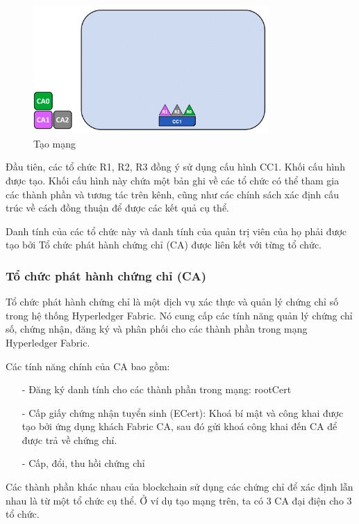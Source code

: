 \begin{figure}[h]
    \centering
    \includegraphics[width=0.8\textwidth]{images/create_network.png}
    \caption{Tạo mạng }
\end{figure}
Đầu tiên, các tổ chức R1, R2, R3 đồng ý sử dụng cấu hình CC1. Khối cấu hình được tạo. 
Khối cấu hình này chứa một bản ghi về các tổ chức có thể tham gia các thành phần và 
tương tác trên kênh, cũng như các chính sách xác định cấu trúc về cách đồng thuận để được các kết quả cụ thể.

Danh tính của các tổ chức này và danh tính của quản trị viên của họ phải 
được tạo bởi Tổ chức phát hành chứng chỉ (CA) được liên kết với từng tổ chức.

\subsubsection*{Tổ chức phát hành chứng chỉ (CA)}

Tổ chức phát hành chứng chỉ là một dịch vụ xác thực và quản lý chứng chỉ số trong hệ thống Hyperledger 
Fabric. Nó cung cấp các tính năng quản lý chứng chỉ số, chứng nhận, đăng ký và phân phối cho các thành 
phần trong mạng Hyperledger Fabric.

Các tính năng chính của CA bao gồm:

\begin{itemize}
    \item[-] Đăng ký danh tính cho các thành phần trong mạng: rootCert
    \item[-] Cấp giấy chứng nhận tuyển sinh (ECert): Khoá bí mật và công khai được tạo bởi ứng dụng khách Fabric CA, sau đó gửi khoá công khai
    đến CA để được trả về chứng chỉ.
    \item[-] Cấp, đổi, thu hồi chứng chỉ
\end{itemize}



Các thành phần khác nhau của blockchain sử dụng các chứng 
chỉ để xác định lẫn nhau là từ một tổ chức cụ thể. Ở ví dụ tạo mạng trên, 
ta có 3 CA đại điện cho 3 tổ chức.


